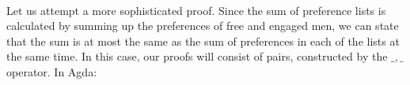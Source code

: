 {\begin{code}
\>[0]%
\>[1482I]\AgdaSymbol{(}\AgdaSpace{}%
\AgdaOperator{\AgdaInductiveConstructor{,}}\AgdaSpace{}%
\AgdaInductiveConstructor{[]}\AgdaSymbol{)}\<%
\\
\>[.]\<[1482I]%
\>[20]\AgdaSymbol{((}\AgdaSpace{}%
\AgdaOperator{\AgdaInductiveConstructor{,}}\AgdaSpace{}%
\AgdaSpace{}%
\AgdaSpace{}%
\AgdaSymbol{)}\AgdaSpace{}%
\AgdaSpace{}%
\AgdaSymbol{)}\<%
\\
%
\>[20]\AgdaSpace{}%
\AgdaSymbol{=}\AgdaSpace{}%
\AgdaSpace{}%
\AgdaSpace{}%
\AgdaSymbol{(}\AgdaSpace{}%
\AgdaSymbol{(}\AgdaSpace{}%
\AgdaSymbol{((}\AgdaSpace{}%
\AgdaOperator{\AgdaInductiveConstructor{,}}\AgdaSpace{}%
\AgdaSymbol{)}\AgdaSpace{}%
\AgdaSpace{}%
\AgdaSymbol{)))}\<%
\\
\>[0]%
\>[1501I]\AgdaSymbol{(}\AgdaSpace{}%
\AgdaOperator{\AgdaInductiveConstructor{,}}\AgdaSpace{}%
\AgdaSpace{}%
\AgdaSpace{}%
\AgdaSymbol{)}\<%
\\
\>[.]\<[1501I]%
\>[20]\AgdaSymbol{((}\AgdaSpace{}%
\AgdaOperator{\AgdaInductiveConstructor{,}}\AgdaSpace{}%
\AgdaSpace{}%
\AgdaSpace{}%
\AgdaSymbol{)}\AgdaSpace{}%
\AgdaSpace{}%
\AgdaSymbol{)}\<%
\\
%
\>[20]\AgdaSpace{}%
\AgdaSymbol{=}\AgdaSpace{}%
\AgdaSpace{}%
\AgdaSymbol{(}\AgdaSpace{}%
\AgdaSymbol{(}\AgdaSpace{}%
\AgdaSpace{}%
\AgdaOperator{\AgdaPrimitive{+}}\AgdaSpace{}%
\AgdaSpace{}%
\AgdaSymbol{))}\AgdaSpace{}%
\AgdaSpace{}%
\AgdaSymbol{(}\AgdaSpace{}%
\AgdaSymbol{)}\<%
\\
\>[0]\<%
\end{code}

Let us attempt a more sophisticated proof. Since the sum of preference lists is calculated by summing up the preferences of free and engaged men, we can state that the sum is at most the same as the sum of preferences in each of the lists at the same time. In this case, our proofs will consist of pairs, constructed by the $\_,\_$ operator. In Agda:

}
